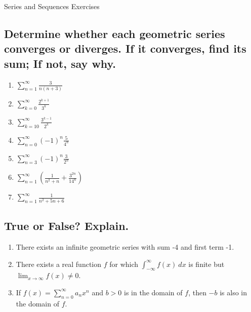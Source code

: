 \documentclass{article}
\begin{document}
\begin{center}
\begin{Huge}Series and Sequences Exercises\end{Huge}
\end{center}


\subsection{Determine whether each geometric series converges or diverges. If it converges, find its sum; If not, say why.}

\begin{multicols}{3}
\begin{enumerate}
\item $\displaystyle \sum_{n=1}^\infty \frac{3}{n(n+3)}$
\item $\displaystyle \sum_{k=0}^{\infty} \frac{2^{k+1}}{3^k}$
\item $\displaystyle \sum_{k=10}^{\infty} \frac{3^{k-1}}{2^k}$
\item $\displaystyle \sum_{n=0}^{\infty}(-1)^n \frac{5}{4^n}$
\item $\displaystyle \sum_{n=3}^{\infty}(-1)^n \frac{3}{2^n}$
\item $\displaystyle \sum_{n=1}^{\infty}\left( \frac{1}{n^2+n} + \frac{3^{2n}}{14^n}\right)$
\item $\displaystyle\sum_{n=1}^{\infty}\frac{1}{n^{2}+5n+6}$
\end{enumerate}
\end{multicols}

\subsection{True or False? Explain.}
\begin{enumerate}
\item There exists an infinite geometric series with sum -4 and first term -1.
\item There exists a real function $f$ for which $\displaystyle\int_{-\infty}^\infty f(x) \ dx$ is finite but $\displaystyle\lim_{x\to\infty} f(x) \neq 0$.
\item If $\displaystyle f(x)=\sum_{n=0}^\infty a_n x^n$ and $b>0$ is in the domain of $f$, then $-b$ is also in the domain of $f$.
\end{enumerate}
\end{document}
